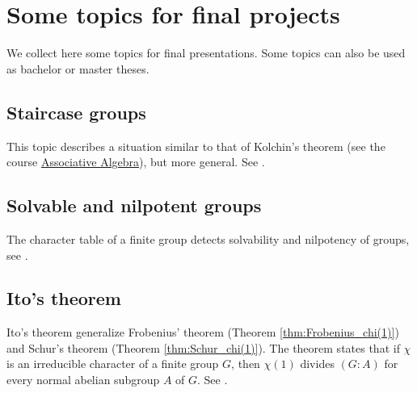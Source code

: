 \section*{Some topics for final projects}

\pagestyle{plain}
\fancyhf{}
\fancyfoot[CE,CO]{\leftmark}
\fancyfoot[LE,RO]{\thepage}

We collect here some topics for final presentations. Some topics
can also be used as bachelor or master theses. 

\subsection*{Staircase groups}

This topic describes a situation similar to that of Kolchin's theorem (see the course \href{https://github.com/vendramin/associative/}{Associative Algebra}), but
more general. See \cite[Chapter 5]{MR1369573}.

\subsection*{Solvable and nilpotent groups}

The character table of a finite group
detects solvability and nilpotency of groups, see
\cite[Chapter 6]{MR1369573}.





\subsection*{Ito's theorem}

Ito's theorem generalize Frobenius' theorem
(Theorem \ref{thm:Frobenius_chi(1)})  
and Schur's theorem (Theorem \ref{thm:Schur_chi(1)}). 
The theorem states that if $\chi$ is an irreducible character
of a finite group $G$, then $\chi(1)$ divides 
$(G:A)$ for every normal abelian subgroup $A$ of $G$. 
See \cite[\S8.1]{MR0450380}. 


